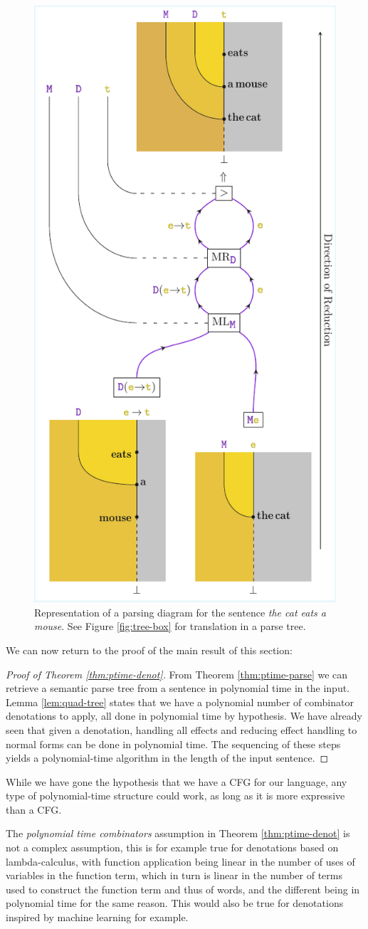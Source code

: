 \begin{figure}
	\centering
	\includegraphics[width=.45\textwidth]{parsing-diagram}
	\caption{Representation of a parsing diagram for the sentence
		\emph{the cat eats a mouse}.
		See Figure \ref{fig:tree-box} for translation in a parse tree.}
	\label{fig:parsing-diagram}
\end{figure}

We can now return to the proof of the main result of this section:
\begin{proof}[Proof of Theorem \ref{thm:ptime-denot}]
	From Theorem \ref{thm:ptime-parse} we can retrieve a
	semantic parse tree from a sentence in polynomial time in the input.
	Lemma \ref{lem:quad-tree} states that we have a polynomial number of
	combinator denotations to apply, all done in polynomial time by hypothesis.
	We have already seen that given a denotation, handling all effects and
	reducing effect handling to normal forms can be done in polynomial time.
	The sequencing of these steps yields a polynomial-time algorithm in the
	length of the input sentence.
\end{proof}

While we have gone the hypothesis that we have a CFG for our language,
any type of polynomial-time structure could work, as long as it is more
expressive than a CFG.

The \emph{polynomial time combinators} assumption in Theorem
\ref{thm:ptime-denot} is not a complex assumption, this is for example true for
denotations based on lambda-calculus, with function application being linear in
the number of uses of variables in the function term, which in turn is linear
in the number of terms used to construct the function term and thus of words,
and the different \fmap{} being in polynomial time for the same reason.
This would also be true for denotations inspired by machine learning for
example.

